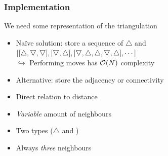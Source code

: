 
\newcommand{\tup}{\bigtriangleup}
\newcommand{\tdown}{\raisebox{\depth}{$\bigtriangledown$}}


\begin{frame}
    \frametitle{Implementation}
    We need some representation of the triangulation
    \begin{itemize}
        \item Naïve solution: store a sequence of $\tup$ and \tdown \\
        \quad $[[\tup, \tdown, \tdown],
        [\tdown, \tup],
        [\tdown, \tup, \tup, \tdown, \tup],
        \cdots]$ \\
        \quad $\hookrightarrow$ Performing moves has $\order{N}$ complexity
        \item Alternative: store the adjacency or connectivity %
    \end{itemize}
    \vfill
    \begin{minipage}[t]{0.49\linewidth}
        \begin{itemize}
            \item Direct relation to distance %
            \item \emph{Variable} amount of neighbours
        \end{itemize}
    \end{minipage}
    \hfill
    \begin{minipage}[t]{0.49\linewidth}
        \begin{itemize}
            \item Two types ($\tup$ and \tdown)
            \item Always \emph{three} neighbours
        \end{itemize}
    \end{minipage}
\end{frame}

